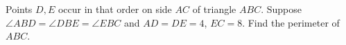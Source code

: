 Points $D,E$ occur in that order on side $AC$ of triangle $ABC$. Suppose $\angle ABD=\angle DBE=\angle EBC$ and $AD=DE=4$, $EC=8$. Find the perimeter of $ABC$.
